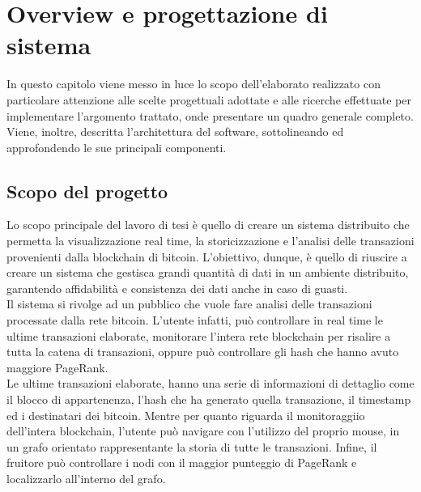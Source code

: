 \chapter{Overview e progettazione di sistema}
\label{chap:overview e progettazione di sistema}
In questo capitolo viene messo in luce lo scopo dell'elaborato realizzato con particolare attenzione alle scelte progettuali adottate e alle ricerche effettuate per implementare l'argomento trattato, onde presentare un quadro generale completo. Viene, inoltre, descritta l'architettura del software, sottolineando ed approfondendo le sue principali componenti.

\section{Scopo del progetto}
\label{sec:scopo del progetto}
Lo scopo principale del lavoro di tesi è quello di creare un sistema distribuito che permetta la visualizzazione real time, la storicizzazione e l'analisi delle transazioni  provenienti dalla blockchain di bitcoin. L'obiettivo, dunque, è quello di riuscire a creare un sistema che gestisca grandi quantità di dati in un ambiente distribuito, garantendo affidabilità e consistenza dei dati anche in caso di guasti.
\\Il sistema si rivolge ad un pubblico che vuole fare analisi delle transazioni processate dalla rete bitcoin. L'utente infatti, può controllare in real time le ultime transazioni elaborate, monitorare l'intera rete blockchain per risalire a tutta la catena di transazioni, oppure può controllare gli hash che hanno avuto maggiore PageRank.
\\Le ultime transazioni elaborate, hanno una serie di informazioni di dettaglio come il blocco di appartenenza, l'hash che ha generato quella transazione, il timestamp ed i destinatari dei bitcoin. Mentre per quanto riguarda il monitoraggiio dell'intera blockchain, l'utente può navigare con l'utilizzo del proprio mouse, in un grafo orientato rappresentante la storia di tutte le transazioni. Infine, il fruitore può controllare i nodi con il maggior punteggio di PageRank e localizzarlo all'interno del grafo.  

